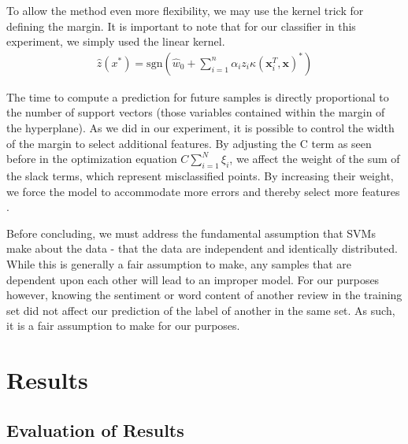 \documentclass{article} %
\begin{document}
To allow the method even more flexibility, we may use the kernel trick for defining the margin. It is important to note that for our classifier in this experiment, we simply used the linear kernel.
\begin{align*}
\hat{z}(x^*) = \text{sgn} \left(\hat{w}_0 + \sum_{i=1}^{n} \alpha_i z_i \kappa(\textbf{x}_i^T, \textbf{x})^*\right)
\end{align*}

The time to compute a prediction for future samples is directly proportional to the number of support vectors (those variables contained within the margin of the hyperplane). As we did in our experiment, it is possible to control the width of the margin to select additional features. By adjusting the C term as seen before in the optimization equation $C \sum_{i=1}^N \xi_i$, we affect the weight of the sum of the slack terms, which represent misclassified points. By increasing their weight, we force the model to accommodate more errors and thereby select more features \cite{mlapp}.

Before concluding, we must address the fundamental assumption that SVMs make about the data - that the data are independent and identically distributed. While this is generally a fair assumption to make, any samples that are dependent upon each other will lead to an improper model. For our purposes however, knowing the sentiment or word content of another review in the training set did not affect our prediction of the label of another in the same set. As such, it is a fair assumption to make for our purposes.

\section{Results}

\subsection{Evaluation of Results}
\end{document}
